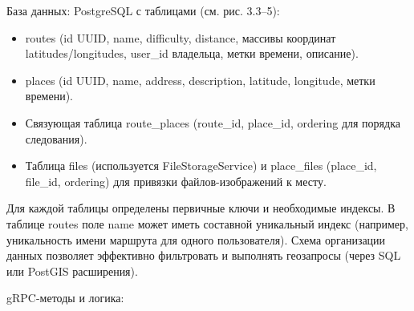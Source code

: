 База данных: PostgreSQL с таблицами (см. рис. 3.3–5):
\begin{itemize}
    \item routes (id UUID, name, difficulty, distance, массивы координат \\ latitudes/longitudes, user\_id владельца, метки времени, описание).
    \item places (id UUID, name, address, description, latitude, longitude, метки времени).
    \item Связующая таблица route\_places (route\_id, place\_id, ordering для порядка следования).
    \item Таблица files (используется FileStorageService) и place\_files (place\_id, file\_id, ordering) для привязки файлов-изображений к месту.
\end{itemize}
Для каждой таблицы определены первичные ключи и необходимые индексы. В таблице routes поле name может иметь составной уникальный индекс (например, уникальность имени маршрута для одного пользователя). Схема организации данных позволяет эффективно фильтровать и выполнять геозапросы (через SQL или PostGIS расширения).

gRPC-методы и логика:

